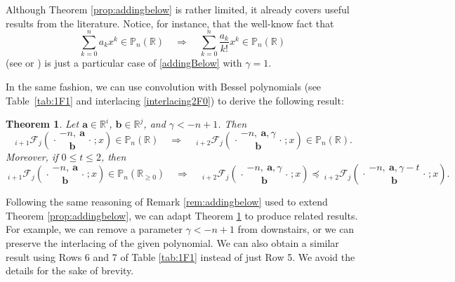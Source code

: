 \documentclass[reqno,11pt]{amsart}
\newtheorem{theorem}{Theorem}[section]
\theoremstyle{remark}
\renewcommand{\P}{\mathbb{P}}
\newcommand{\R}{\mathbb{R}}
\newcommand*\pFq[5]{%
 {\ }_{#1}{\mathcal F}_{#2}{\left(\genfrac..{0pt}{}{#3}{#4};#5\right)}%
}
\begin{document}
Although Theorem \ref{prop:addingbelow} is rather limited, it already covers useful results from the literature. Notice, for instance, that the well-know fact that 
    $$
    \sum_{k=0}^n a_k x^k\in \P_n(\R) \quad \Rightarrow  \quad  \sum_{k=0}^n \frac{a_k}{k !} x^k\in \P_n(\R)
    $$
    (see \cite[Theorem 2.4.1]{polya1914uber} or \cite[Problem V.1.65]{polya1976problems}) is just a particular case of \eqref{addingBelow} with $\gamma=1$. 

    In the same fashion, we can use convolution with Bessel polynomials (see Table~\ref{tab:1F1} and interlacing \eqref{interlacing2F0}) to derive the following result:
\begin{theorem}
    \label{prop:convBessel}
    Let $\bm a\in \R^i$, $\bm b \in \R^j$, and $\gamma <-n+1$.
    Then
    \begin{equation}
        \label{convBessel1}
        \pFq{i+1}{j}{-n,\ \bm a}{ \bm b}{x} \in \P_n(\R)
     \quad \Longrightarrow \quad 
    \pFq{i+2}{j}{-n,\ \bm a, \gamma}{ \bm b}{x} \in \P_n(\R).
    \end{equation}
    Moreover, if   $0\leq t\leq 2$, then 
    $$
      \pFq{i+1}{j}{-n,\ \bm a}{ \bm b}{x} \in \P_n(\R_{\ge 0})
     \quad \Longrightarrow \quad 
     \pFq{i+2}{j}{-n,\ \bm a, \gamma}{ \bm b}{x}\preccurlyeq\pFq{i+2}{j}{-n,\ \bm a, \gamma-t}{ \bm b}{x}.$$
\end{theorem}

Following the same reasoning of Remark \ref{rem:addingbelow} used to extend Theorem \ref{prop:addingbelow}, we can adapt Theorem \ref{prop:convBessel} to produce related results. For example, we can remove a parameter $\gamma <-n+1$ from downstairs, or we can preserve the interlacing of the given polynomial. We can also obtain a similar result using Rows 6 and 7 of Table \ref{tab:1F1} instead of just Row 5. We avoid the details for the sake of brevity.
\end{document}
